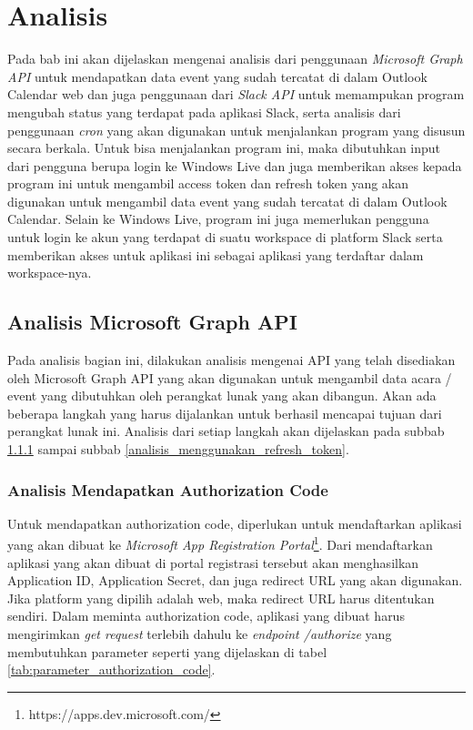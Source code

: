 \chapter{Analisis}
\label{chap:analisis}

Pada bab ini akan dijelaskan mengenai analisis dari penggunaan \textit{Microsoft Graph API} untuk mendapatkan data event yang sudah tercatat di dalam Outlook Calendar web dan juga penggunaan dari \textit{Slack API} untuk memampukan program mengubah status yang terdapat pada aplikasi Slack, serta analisis dari penggunaan \textit{cron} yang akan digunakan untuk menjalankan program yang disusun secara berkala. Untuk bisa menjalankan program ini, maka dibutuhkan input dari pengguna berupa login ke Windows Live dan juga memberikan akses kepada program ini untuk mengambil access token dan refresh token yang akan digunakan untuk mengambil data event yang sudah tercatat di dalam Outlook Calendar. Selain ke Windows Live, program ini juga memerlukan pengguna untuk login ke akun yang terdapat di suatu workspace di platform Slack serta memberikan akses untuk aplikasi ini sebagai aplikasi yang terdaftar dalam workspace-nya.  

\section{Analisis Microsoft Graph API}
\label{sec:analisis_microsoft_graph_api}

Pada analisis bagian ini, dilakukan analisis mengenai API yang telah disediakan oleh Microsoft Graph API yang akan digunakan untuk mengambil data acara / event yang dibutuhkan oleh perangkat lunak yang akan dibangun. Akan ada beberapa langkah yang harus dijalankan untuk berhasil mencapai tujuan dari perangkat lunak ini. Analisis dari setiap langkah akan dijelaskan pada subbab \ref{analisis_authorization_code} sampai subbab \ref{analisis_menggunakan_refresh_token}.

\subsection{Analisis Mendapatkan Authorization Code}
\label{analisis_authorization_code}
Untuk mendapatkan authorization code, diperlukan untuk mendaftarkan aplikasi yang akan dibuat ke \textit{Microsoft App Registration Portal}\footnote{https://apps.dev.microsoft.com/}. Dari mendaftarkan aplikasi yang akan dibuat di portal registrasi tersebut akan menghasilkan Application ID, Application Secret, dan juga redirect URL yang akan digunakan. Jika platform yang dipilih adalah web, maka redirect URL harus ditentukan sendiri. Dalam meminta authorization code, aplikasi yang dibuat harus mengirimkan \textit{get request} terlebih dahulu ke \textit{endpoint /authorize} yang membutuhkan parameter seperti yang dijelaskan di tabel \ref{tab:parameter_authorization_code}. 

